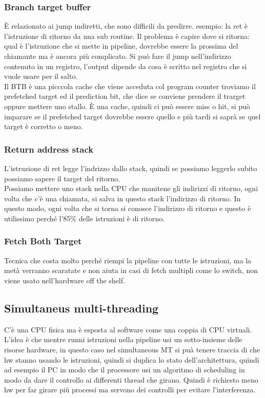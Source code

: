 \documentclass[12pt, oneside]{extbook} %
\begin{document}
\subsubsection{Branch target buffer}
È relazionato ai jump indiretti, che sono difficili da predirre. esempio: la ret è l'istruzione di ritorno da una sub routine. Il problema è capire dove si ritorna: qual è l'istruzione che si mette in pipeline, dovrebbe essere la prossima del chiamante ma è ancora più complicato. Si può fare il jump nell'indirizzo contenuto in un registro, l'output dipende da cosa è scritto nel registro che si vuole usare per il salto.\\ Il BTB è una picccola cache che viene acceduta col program counter 
troviamo il prefetched target ed il prediction bit, che dice se conviene prendere il trarget oppure mettere uno stallo. È una cache, quindi ci può essere miss o hit, si può imparare se il prefetched target dovrebbe essere quello e più tardi si saprà se quel target è corretto o meno.
\subsubsection{Return address stack}
L'istruzione di ret legge l'indrizzo dallo stack, quindi se possiamo leggerlo subito possiamo sapere il target del ritorno.\\ Possiamo mettere uno stack nella CPU che manitene gli indirizzi di ritorno, ogni volta che c'è una chiamata, si salva in questo stack l'indirizzo di ritorno. In questo modo, ogni volta che si torna si conosce l'indirizzo di ritorno e questo è utilissimo perché l'85\% delle istruzioni è di ritorno.
\subsubsection{Fetch Both Target}
Tecnica che costa molto perché riempi la pipeline con tutte le istruzioni, ma la metà verranno scaratate e non aiuta in casi di fetch multipli come lo \textsf{switch}, non viene usato nell'hardware off the shelf.
\subsection{Simultaneus multi-threading}
C'è una CPU fisica ma è esposta al software come una coppia di CPU virtuali. L'idea è che mentre runni istruzioni nella pipeline usi un sotto-insieme delle risorse hardware, in questo caso nel simultaneous MT si puà tenere traccia di che hw stanno usando le istruzioni, quindi si duplica lo stato dell'architettura, quindi ad esempio il PC in modo che il processore usi un algoritmo di scheduling in modo da dare il controllo ai differenti thread che girano. Quindi è richiesto meno hw per far girare più processi ma servono dei controlli per evitare l'interferenza.
\end{document}
